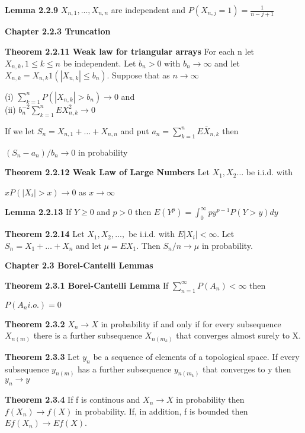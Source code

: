 \documentclass{article}
\begin{document}
\textbf {Lemma 2.2.9} $X_{n, 1} ,..., X_{n,n}$ are independent and $P(X_{n,j} = 1) = \frac{1}{n-j+1}$

\textbf {Chapter 2.2.3 Truncation}

\textbf {Theorem 2.2.11 Weak law for triangular arrays} For each n let $X_{n,k}, 1 \leq k \leq n$ be independent. Let $b_n > 0$ with $b_n \rightarrow \infty$ and let $X_{n,k} = X_{n,k} 1(|X_{n,k}| \leq  b_n)$. Suppose that as $n \rightarrow \infty$
\begin{center}
(i) $\sum_{k=1}^n P(|X_{n,k}| > b_n) \rightarrow 0$ and \\
(ii) $b_n^{-2} \sum_{k=1}^n E X_{n,k}^2 \rightarrow 0$
\end{center}
If we let $S_n = X_{n,1} + \dots + X_{n,n}$ and put $a_n = \sum_{k=1}^n E \bar{X}_{n,k}$ then
\begin{center}
$(S_n - a_n) / b_n \rightarrow 0$ in probability
\end{center}

\textbf {Theorem 2.2.12 Weak Law of Large Numbers} Let $X_1 , X_2 \dots$ be i.i.d. with
\begin{center}
$x P(|X_i| > x) \rightarrow 0$ as $x \rightarrow \infty$
\end{center}

\textbf {Lemma 2.2.13} If $Y \geq 0$ and $p > 0$ then $E(Y^p) = \int_0^\infty py^{p-1} P(Y > y) dy$

\textbf {Theorem 2.2.14} Let $X_1 , X_2 ,...,$ be i.i.d. with $E|X_i| < \infty$. Let $S_n = X_1 + \dots + X_n$ and let $\mu = EX_1.$ Then $S_n/n \rightarrow \mu$ in probability.

\textbf {Chapter 2.3 Borel-Cantelli Lemmas}

\textbf {Theorem 2.3.1 Borel-Cantelli Lemma} If $\sum_{n=1}^\infty P(A_n) < \infty$ then 
\begin{center}
$P(A_n i.o.) = 0$
\end{center}

\textbf {Theorem 2.3.2} $X_n \rightarrow X$ in probability if and only if for every subsequence $X_{n(m)}$ there is a further subsequence $X_{n(m_k)}$ that converges almost surely to X.

\textbf {Theorem 2.3.3} Let $y_n$ be a sequence of elements of a topological space. If every subsequence $y_{n(m)}$ has a further subsequence $y_{n(m_k)}$ that converges to y then $y_n \rightarrow y$

\textbf {Theorem 2.3.4} If f is continous and $X_n \rightarrow X$ in probability then $f(X_n) \rightarrow f(X)$ in probability. If, in addition, f is bounded then $E f(X_n) \rightarrow E f(X)$.
\end{document}
